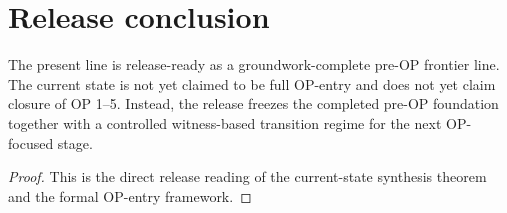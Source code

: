 \section{Release conclusion}
\begin{corollary}\label{cor:groundwork-complete-frontier-release-reading}
The present line is release-ready as a groundwork-complete pre-OP frontier line. The current state is not yet claimed to be full OP-entry and does not yet claim closure of OP 1--5. Instead, the release freezes the completed pre-OP foundation together with a controlled witness-based transition regime for the next OP-focused stage.
\end{corollary}

\begin{proof}
This is the direct release reading of the current-state synthesis theorem and the formal OP-entry framework.
\end{proof}


